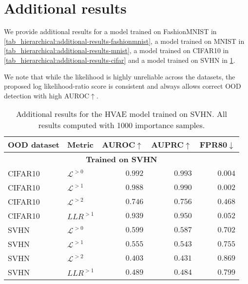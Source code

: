 {\section{Additional results}
We provide additional results for a model trained on FashionMNIST in \cref{tab_hierarchical:additional-results-fashionmnist}, a model trained on MNIST in \cref{tab_hierarchical:additional-results-mnist}, a model trained on CIFAR10 in \cref{tab_hierarchical:additional-results-cifar} and a model trained on SVHN in \cref{tab_hierarchical:additional-results-svhn}.

We note that while the likelihood is highly unreliable across the datasets, the proposed log likelihood-ratio score is consistent and always allows correct OOD detection with high AUROC$\uparrow$.

\begin{table}[t]
    \centering
    \begin{tabular}{llrrr}
        \toprule
        OOD dataset & Metric & AUROC$\uparrow$ & AUPRC$\uparrow$ & FPR80$\downarrow$ \\
        \midrule
        \multicolumn{5}{c}{\textbf{Trained on SVHN}} \\
        \midrule
        CIFAR10            &  $\mathcal{L}^{>0}$         &  $0.992$  &  $0.993$  &  $0.004$  \\
        CIFAR10            &  $\mathcal{L}^{>1}$         &  $0.988$  &  $0.990$  &  $0.002$  \\
        CIFAR10            &  $\mathcal{L}^{>2}$         &  $0.746$  &  $0.756$  &  $0.468$  \\
        CIFAR10            &  $LLR^{>1}$       &  $0.939$  &  $0.950$  &  $0.052$  \\
        \midrule
        SVHN               &  $\mathcal{L}^{>0}$         &  $0.599$  &  $0.587$  &  $0.702$  \\
        SVHN               &  $\mathcal{L}^{>1}$         &  $0.555$  &  $0.543$  &  $0.755$  \\
        SVHN               &  $\mathcal{L}^{>2}$         &  $0.403$  &  $0.431$  &  $0.869$  \\
        SVHN               &  $LLR^{>1}$       &  $0.489$  &  $0.484$  &  $0.799$  \\
        \bottomrule
    \end{tabular}
    \caption[Additional results for the HVAE model trained on SVHN]{Additional results for the HVAE model trained on SVHN. All results computed with 1000 importance samples.}
    \label{tab_hierarchical:additional-results-svhn}
\end{table}

}
